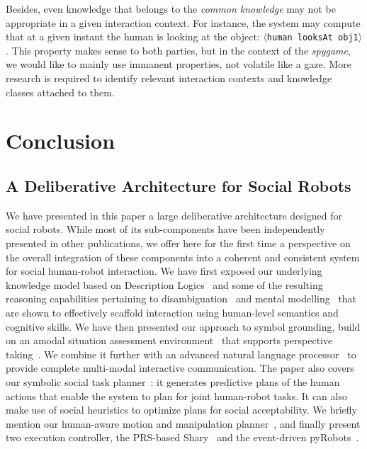 \documentclass[preprint,3p,times]{elsarticle}
\newcommand{\stmt}[1]{{\footnotesize\tt$\langle$#1\relax$\rangle$}}
\begin{document}
Besides, even knowledge that belongs to the \emph{common knowledge} may not be
appropriate in a given interaction context. For instance, the system may
compute that at a given instant the human is looking at the object: \stmt{human
looksAt obj1}. This property makes sense to both parties, but in the context of
the \emph{spygame}, we would like to mainly use immanent properties, not
volatile like a gaze. More research is required to identify relevant
interaction contexts and knowledge classes attached to them.

\section{Conclusion}
\label{sect|conclusion}

\subsection{A Deliberative Architecture for Social Robots}

We have presented in this paper a large deliberative architecture designed for
social robots. While most of its sub-components have been independently
presented in other publications, we offer here for the first time a perspective
on the overall integration of these components into a coherent and consistent
system for social human-robot interaction. We have first exposed our underlying
knowledge model based on Description Logics~\cite{Lemaignan2010} and some of the
resulting reasoning capabilities pertaining to disambiguation~\cite{Ros2010b}
and mental modelling~\cite{warnier2012when} that are shown to effectively
scaffold interaction using human-level semantics and cognitive skills. We have
then presented our approach to symbol grounding, build on an amodal situation
assessment environment~\cite{Sisbot2011} that supports perspective
taking~\cite{Marin2008,Ros2010}. We
combine it further with an advanced natural
language processor~\cite{Lemaignan2011a} to provide complete multi-modal interactive
communication.  The paper also covers our symbolic social task
planner~\cite{Alili2008, Alili2009, Lallement2014}: it generates predictive
plans of the human actions that enable the system to plan for joint human-robot
tasks. It can also make use of social heuristics to optimize plans for social
acceptability. We briefly mention our human-aware motion and manipulation
planner~\cite{Sisbot2008,Mainprice2011,Pandey2011}, and finally present two
execution controller, the PRS-based {\sc Shary}~\cite{clodic2008shary,fiore2014} and the
event-driven {\sc pyRobots}~\cite{lemaignan2015pyrobots}.
\end{document}
